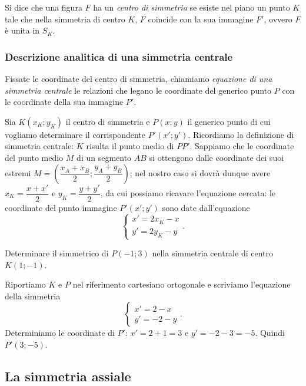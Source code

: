 \begin{definizione}
Si dice che una figura $F$ ha un \emph{centro di simmetria} se esiste nel piano un punto $K$ tale che nella simmetria di centro $K$, $F$ coincide con la sua immagine $F'$, ovvero $F$ è unita in $S_K$. 
\end{definizione}

\subsubsection{Descrizione analitica di una simmetria centrale}

\begin{definizione}
Fissate le coordinate del centro di simmetria, chiamiamo \emph{equazione di una simmetria centrale} le relazioni che legano le coordinate del generico punto $P$ con le coordinate della sua immagine $P'$.
\end{definizione}

Sia $K(x_K;y_K)$ il centro di simmetria e $P(x;y)$ il generico punto di cui vogliamo determinare il corrispondente $P'(x';y')$. Ricordiamo la definizione di simmetria centrale: $K$ risulta il punto medio di $PP'$. Sappiamo che le coordinate del punto medio $M$ di un segmento $AB$ si ottengono dalle coordinate dei suoi estremi $M=\left(\dfrac{x_A+x_B}{2};\dfrac{y_A+y_B}{2}\right)$; nel nostro caso si dovrà dunque avere $x_K=\dfrac{x+x'}{2}$ e $y_K=\dfrac{y+y'}{2}$, da cui possiamo ricavare l'equazione cercata: le coordinate del punto immagine $P'(x';y')$ sono date dall'equazione
\[\begin{cases}x'=2x_K-x\\y'=2y_K-y\end{cases}.\]
\pagebreak
\begin{exrig}
\begin{esempio}
Determinare il simmetrico di $P(-1;3)$ nella simmetria centrale di centro $K(1;-1)$.\vspace{7pt}

Riportiamo $K$ e $P$ nel riferimento cartesiano ortogonale e scriviamo l'equazione della simmetria
\[\begin{cases}x'=2-x\\y'=-2-y\end{cases}.\]
Determiniamo le coordinate di $P'$: $x'=2+1=3$ e $y'=-2-3=-5$. Quindi $P'(3;-5)$.
\end{esempio}
\end{exrig}

\subsection{La simmetria assiale}


